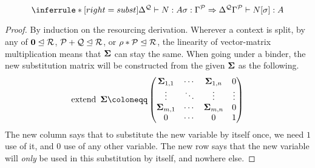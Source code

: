 \begin{lemma}[Substitution]
  \[
    \inferrule*[right=subst]{
      \Delta^{\mathcal Q} \vdash N : A
      \\ \sigma : \Gamma^{\mathcal P} \Rightarrow \Delta^{\mathcal Q}
    }
    {
      \Gamma^{\mathcal P} \vdash N[\sigma] : A
    }
  \]
\end{lemma}
\renewcommand{\proofname}{Proof sketch}
\begin{proof}
  By induction on the resourcing derivation.
  Wherever a context is split, by any of $\mathbf{0} \trianglelefteq \mathcal R$,
  $\mathcal P + \mathcal Q \trianglelefteq \mathcal R$, or
  $\rho * \mathcal P \trianglelefteq \mathcal R$, the linearity of vector-matrix
  multiplication means that $\mathbf{\Sigma}$ can stay the same.
  When going under a binder, the new substitution matrix will be constructed
  from the given $\mathbf{\Sigma}$ as the following.
  \newcommand*{\mathhuge}[1]{\mathlarger{\mathlarger{\mathlarger{\mathlarger{#1}}}}}
  \[
    \operatorname{extend}~\mat \Sigma \coloneqq
    \begin{pmatrix}
      \mat \Sigma_{1,1} & \cdots & \mat \Sigma_{1,n} & 0 \\
      \vdots & \ddots & \vdots & \vdots \\
      \mat \Sigma_{m,1} & \cdots & \mat \Sigma_{m,n} & 0 \\
      0 & \cdots & 0 & 1
    \end{pmatrix}
  \]
  The new column says that to substitute the new variable by itself once, we
  need $1$ use of it, and $0$ use of any other variable.
  The new row says that the new variable will \emph{only} be used in this
  substitution by itself, and nowhere else.
\end{proof}